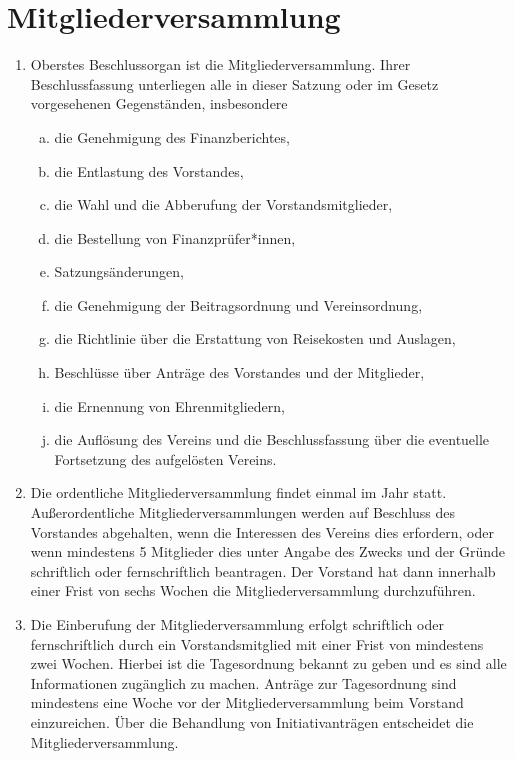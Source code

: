\documentclass[a4paper]{article}
\begin{document}
\section{Mitgliederversammlung}
\begin{enumerate}
	\item Oberstes Beschlussorgan ist die Mitgliederversammlung. Ihrer Beschlussfassung unterliegen alle in dieser Satzung oder im Gesetz vorgesehenen Gegenständen, insbesondere
	\begin{enumerate}[a)]
		\item die Genehmigung des Finanzberichtes,
		\item die Entlastung des Vorstandes,
		\item die Wahl und die Abberufung der Vorstandsmitglieder,
		\item die Bestellung von Finanzprüfer*innen,
		\item Satzungsänderungen,
		\item die Genehmigung der Beitragsordnung und Vereinsordnung,
		\item die Richtlinie über die Erstattung von Reisekosten und Auslagen,
		\item Beschlüsse über Anträge des Vorstandes und der Mitglieder,
		\item die Ernennung von Ehrenmitgliedern,
		\item die Auflösung des Vereins und die Beschlussfassung über die eventuelle Fortsetzung des aufgelösten Vereins.
	\end{enumerate}
	\item Die ordentliche Mitgliederversammlung findet einmal im Jahr statt. Außerordentliche Mitgliederversammlungen werden auf Beschluss des Vorstandes abgehalten, wenn die Interessen des Vereins dies erfordern, oder wenn mindestens 5 Mitglieder dies unter Angabe des Zwecks und der Gründe schriftlich oder fernschriftlich beantragen. Der Vorstand hat dann innerhalb einer Frist von sechs Wochen die Mitgliederversammlung durchzuführen.

	\item Die Einberufung der Mitgliederversammlung erfolgt schriftlich oder fernschriftlich durch ein Vorstandsmitglied mit einer Frist von mindestens zwei Wochen. Hierbei ist die Tagesordnung bekannt zu geben und es sind alle Informationen zugänglich zu machen. Anträge zur Tagesordnung sind mindestens eine Woche vor der Mitgliederversammlung beim Vorstand einzureichen. Über die Behandlung von Initiativanträgen entscheidet die Mitgliederversammlung.


\end{enumerate}
\end{document}
